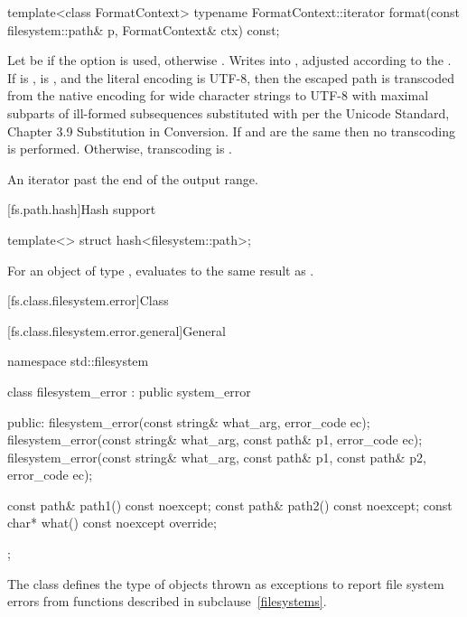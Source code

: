 %
\begin{itemdecl}
template<class FormatContext>
  typename FormatContext::iterator
    format(const filesystem::path& p, FormatContext& ctx) const;
\end{itemdecl}

\begin{itemdescr}
\pnum
\effects
Let  be 
if the  option is used,
otherwise .
Writes  into ,
adjusted according to the .
If  is ,
 is , and
the literal encoding is UTF-8,
then the escaped path is transcoded from the native encoding for
wide character strings to UTF-8 with
maximal subparts of ill-formed subsequences
substituted with  
per the Unicode Standard, Chapter 3.9  Substitution in Conversion.
If  and  are the same
then no transcoding is performed.
Otherwise, transcoding is
.

\pnum
\returns
An iterator past the end of the output range.
\end{itemdescr}

[fs.path.hash]{Hash support}

\begin{itemdecl}
template<> struct hash<filesystem::path>;
\end{itemdecl}

\begin{itemdescr}
\pnum
For an object  of type ,
 evaluates to the same result as
.
\end{itemdescr}

[fs.class.filesystem.error]{Class }

[fs.class.filesystem.error.general]{General}

%
\begin{codeblock}
namespace std::filesystem {
  class filesystem_error : public system_error {
  public:
    filesystem_error(const string& what_arg, error_code ec);
    filesystem_error(const string& what_arg,
                     const path& p1, error_code ec);
    filesystem_error(const string& what_arg,
                     const path& p1, const path& p2, error_code ec);

    const path& path1() const noexcept;
    const path& path2() const noexcept;
    const char* what() const noexcept override;
  };
}
\end{codeblock}
\pnum
The class  defines the type of
objects thrown as exceptions to report file system errors from functions described in
subclause~\ref{filesystems}.

